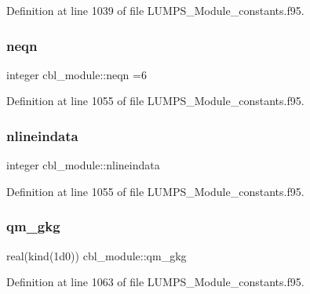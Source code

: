 Definition at line 1039 of file L\+U\+M\+P\+S\+\_\+\+Module\+\_\+constants.\+f95.

\mbox{\label{namespacecbl__module_a52c76c9e4368adec7890e95932374f73}} 
\subsubsection{\texorpdfstring{neqn}{neqn}}
{\footnotesize\ttfamily integer cbl\+\_\+module\+::neqn =6}



Definition at line 1055 of file L\+U\+M\+P\+S\+\_\+\+Module\+\_\+constants.\+f95.

\mbox{\label{namespacecbl__module_a5f768f5aae74fa7b0c2d66118fc71ba5}} 
\subsubsection{\texorpdfstring{nlineindata}{nlineindata}}
{\footnotesize\ttfamily integer cbl\+\_\+module\+::nlineindata}



Definition at line 1055 of file L\+U\+M\+P\+S\+\_\+\+Module\+\_\+constants.\+f95.

\mbox{\label{namespacecbl__module_a652625bc960f05e00df2f7bf48cb7444}} 
\subsubsection{\texorpdfstring{qm\+\_\+gkg}{qm\_gkg}}
{\footnotesize\ttfamily real(kind(1d0)) cbl\+\_\+module\+::qm\+\_\+gkg}



Definition at line 1063 of file L\+U\+M\+P\+S\+\_\+\+Module\+\_\+constants.\+f95.

\mbox{\label{namespacecbl__module_aa9e98a57d9be62a92919841c4ad428b9}} 
